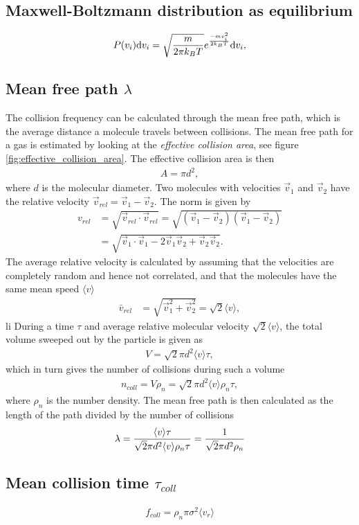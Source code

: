 \subsection{Maxwell-Boltzmann distribution as equilibrium}
\label{sec:maxwell_boltzmann_distribution}
\begin{align}
	\label{eq:maxwell_boltzmann_distribution}
	P(v_i)\mathrm{d}v_i = \sqrt{m\over 2\pi k_BT}e^{-mv_i^2\over 2k_BT}\mathrm{d}v_i,
\end{align}
\subsection{Mean free path $\lambda$}
\label{sec:mean_free_path_calculation}
The collision frequency can be calculated through the mean free path, which is the average distance a molecule travels between collisions. The mean free path for a gas is estimated by looking at the \textit{effective collision area}, see figure \ref{fig:effective_collision_area}. The effective collision area is then
\begin{align}
	A = \pi d^2,
\end{align}
where $d$ is the molecular diameter. Two molecules with velocities $\vec v_1$ and $\vec v_2$ have the relative velocity $\vec v_{rel} = \vec v_1 - \vec v_2$. The norm is given by
\begin{align}
	v_{rel} &= \sqrt{\vec v_{rel}\cdot \vec v_{rel} } = \sqrt{ (\vec v_1 - \vec v_2)(\vec v_1 - \vec v_2)}\\
	&= \sqrt{\vec v_1\cdot \vec v_1 - 2\vec v_1\vec v_2 + \vec v_2\vec v_2}.
\end{align}
The average relative velocity is calculated by assuming that the velocities are completely random and hence not correlated, and that the molecules have the same mean speed $\langle v\rangle$
\begin{align}
	\bar v_{rel} &= \sqrt{\vec v_1^2 + \vec v_2^2} = \sqrt 2 \langle v\rangle,
\end{align}li
During a time $\tau$ and average relative molecular velocity $\sqrt 2 \langle v\rangle$, the total volume sweeped out by the particle is given as
\begin{align}
	V = \sqrt 2 \pi d^2\langle v\rangle \tau,
\end{align}
which in turn gives the number of collisions during such a volume
\begin{align}
	\label{eq:num_collisions}
	n_{coll} = V\rho_n = \sqrt 2 \pi d^2\langle v\rangle \rho_n \tau,
\end{align}
where $\rho_n$ is the number density. The mean free path is then calculated as the length of the path divided by the number of collisions
\begin{align}
	\label{eq:mean_free_path}
	\lambda = {\langle v\rangle \tau\over \sqrt 2 \pi d^2\langle v\rangle \rho_n\tau} = {1 \over \sqrt 2 \pi d^2 \rho_n}
\end{align}
\subsection{Mean collision time $\tau_{coll}$}
\begin{align}
	\label{eq:coll_frequency}
	f_{coll} = \rho_n \pi \sigma^2 \langle v_r \rangle
\end{align}